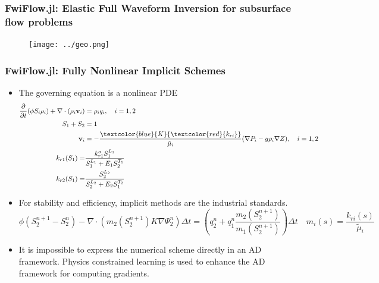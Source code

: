 \documentclass{beamer}
\begin{document}
\begin{frame}
	\frametitle{FwiFlow.jl: Elastic Full Waveform Inversion for subsurface flow problems}
	\begin{figure}[hbt]
  \texttt{[image: ../geo.png]}
\end{figure}
\end{frame}

\begin{frame}
\frametitle{FwiFlow.jl: Fully Nonlinear Implicit Schemes}
\begin{itemize}
	\item The governing equation is a nonlinear PDE
{\scriptsize
	\begin{align*}
	\frac{\partial }{{\partial t}}(\phi {{S_i}}{\rho _i}) + \nabla  \cdot ({\rho _i}{\mathbf{v}_i}) &= {\rho _i}{q_i},\quad 
      i = 1,2	\\
      S_{1} + S_{2} &= 1\\
      {\mathbf{v}_i} &= - \frac{{\textcolor{blue}{K}{\textcolor{red}{k_{ri}}}}}{{{\tilde{\mu}_i}}}(\nabla {P_i} - g{\rho _i}\nabla Z), \quad
      i=1, 2\\
	k_{r1}(S_1) =& \frac{k_{r1}^o S_1^{L_1}}{S_1^{L_1} + E_1 S_2^{T_1}}\\
	k_{r2}(S_1) =& \frac{ S_2^{L_2}}{S_2^{L_2} + E_2 S_1^{T_2}}
	\end{align*}
	}
	\item For stability and efficiency, implicit methods are the industrial standards. 
{\scriptsize	$$\phi (S_2^{n + 1} - S_2^n) - \nabla \cdot \left( {{m_{2}}(S_2^{n + 1})K\nabla \Psi _2^n} \right) \Delta t = 
\left(q_2^n + q_1^n \frac{m_2(S^{n+1}_2)}{m_1(S^{n+1}_2)}\right) 
\Delta t\quad m_i(s) = \frac{k_{ri}(s)}{\tilde \mu_i}
$$}
\item It is impossible to express the numerical scheme directly in an AD framework. Physics constrained learning is used to enhance the AD framework for computing gradients. 
\end{itemize}

\end{frame}
\end{document}
